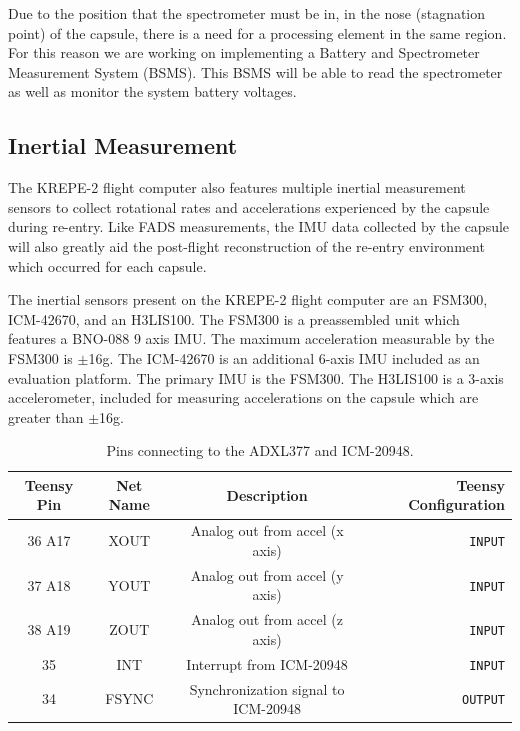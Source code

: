 \documentclass{article}
\begin{document}
Due to the position that the spectrometer must be in, in the nose (stagnation point) of the capsule, there is a need for a processing element in the same region. For this reason we are working on implementing a Battery and Spectrometer Measurement System (BSMS). This BSMS will be able to read the spectrometer as well as monitor the system battery voltages. 

\subsection{Inertial Measurement}
The KREPE-2 flight computer also features multiple inertial measurement sensors to collect rotational rates and accelerations experienced by the capsule during re-entry. Like FADS measurements, the IMU data collected by the capsule will also greatly aid the post-flight reconstruction of the re-entry environment which occurred for each capsule.

The inertial sensors present on the KREPE-2 flight computer are an FSM300, ICM-42670, and an H3LIS100. The FSM300 is a preassembled unit which features a BNO-088 9 axis IMU. The maximum acceleration measurable by the FSM300 is $\pm$16g. The ICM-42670 is an additional 6-axis IMU included as an evaluation platform. The primary IMU is the FSM300. The H3LIS100 is a 3-axis accelerometer, included for measuring accelerations on the capsule which are greater than $\pm$16g.

\begin{table}[H]
    \centering
    \caption{Pins connecting to the ADXL377 and ICM-20948.}
    \label{tab:pins_motionsensor}
    \begin{tabular}{c|c|c|r}
    Teensy Pin & Net Name  & Description   & Teensy Configuration \\
    \hline 
    36 A17 & XOUT & Analog out from accel (x axis) & \texttt{INPUT} \\
    37 A18 & YOUT & Analog out from accel (y axis) & \texttt{INPUT} \\
    38 A19 & ZOUT & Analog out from accel (z axis) & \texttt{INPUT} \\
    35 & INT & Interrupt from ICM-20948 & \texttt{INPUT} \\
    34 & FSYNC & Synchronization signal to ICM-20948 & \texttt{OUTPUT} 
    \end{tabular}
\end{table}

\end{document}
